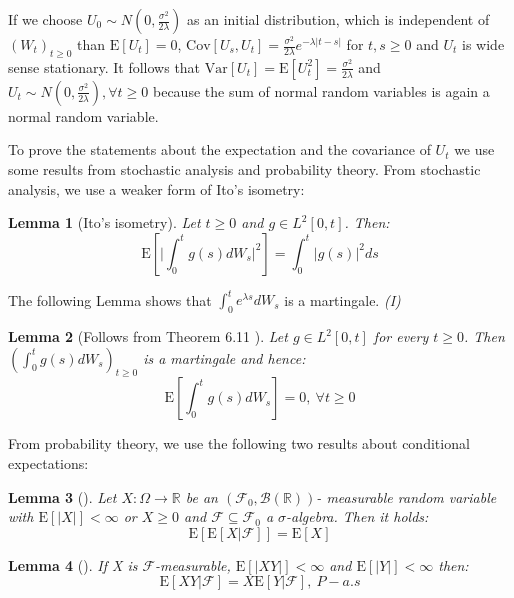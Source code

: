 \documentclass[%
thesis=student,%
coverpage=false,%
titlepage=false,%
headmarks=true, %
english,%
font=libertine, %
math=newpxtx, %
BCOR=5mm,%
coverBCOR=11mm%
]{tumbook}
\newtheorem{lemma}{Lemma}
\begin{document}
If we choose $U_{0} \sim N(0,\frac{\sigma^{2}}{2\lambda})$ as an initial distribution, which is independent of $(W_{t})_{t\geq 0}$ than $\mathrm{E}[U_{t}] = 0$, $\mathrm{Cov}[U_{s},U_{t}] = \frac{\sigma^2}{2\lambda}e^{-\lambda\lvert t-s \rvert}$ for $t,s \geq 0$ and $U_{t}$ is wide sense stationary. It follows that $\mathrm{Var}[U_{t}]=\mathrm{E}[U_{t}^{2}]=\frac{\sigma^2}{2\lambda}$ and $U_{t} \sim N(0,\frac{\sigma^2}{2\lambda}), \forall t \geq 0$ because the sum of normal random variables is again a normal random variable.

To prove the statements about the expectation and the covariance of $U_{t}$ we use some results from stochastic analysis and probability theory.
From stochastic analysis, we use a weaker form of Ito's isometry:

\begin{lemma}[Ito's isometry]
 Let $t \geq 0$ and $g \in L^2[0,t]$. Then:
 \[
 \mathrm{E}[\lvert\int_{0}^{t}g(s)dW_{s}\rvert^{2}] = \int_{0}^{t}\lvert g(s) \rvert ^2ds
 \]
\end{lemma}

The following Lemma shows that $\int_{0}^{t}e^{\lambda s}dW_{s}$ is a martingale.   \textit{(I)}

\begin{lemma}[Follows from Theorem 6.11 \cite{gantert:2024}]
    Let $g \in L^2[0,t]$ for every $t \geq 0$. Then $(\int_{0}^{t}g(s)dW_{s})_{t\geq 0}$ is a martingale and hence:
    \[
    \mathrm{E}[\int_{0}^{t}g(s)dW_{s}] = 0, \ \forall t \geq 0
    \]
\end{lemma}

From probability theory, we use the following two results about conditional expectations:

\begin{lemma}[\cite{rolles:2023}]
    Let $X: \Omega \rightarrow \mathbb{R}$ be an $(\mathcal{F}_{0},\mathcal{B}(\mathbb{R}))$- measurable random variable with $\mathrm{E}[\lvert X \rvert] < \infty$ or $X \geq 0$ and $\mathcal{F} \subseteq \mathcal{F}_{0}$ a $\sigma$-algebra. Then it holds:
    \[
    \mathrm{E}[\mathrm{E}[X|\mathcal{F}]] = \mathrm{E}[X]
    \]
\end{lemma}

\begin{lemma}[\cite{rolles:2023}]
    If X is $\mathcal{F}$-measurable, $\mathrm{E}[\lvert XY \rvert] < \infty$ and $\mathrm{E}[\lvert Y \rvert]< \infty$ then:
    \[
    \mathrm{E}[XY|\mathcal{F}] = X\mathrm{E}[Y|\mathcal{F}], \ P-a.s
    \]
\end{lemma}
\end{document}
